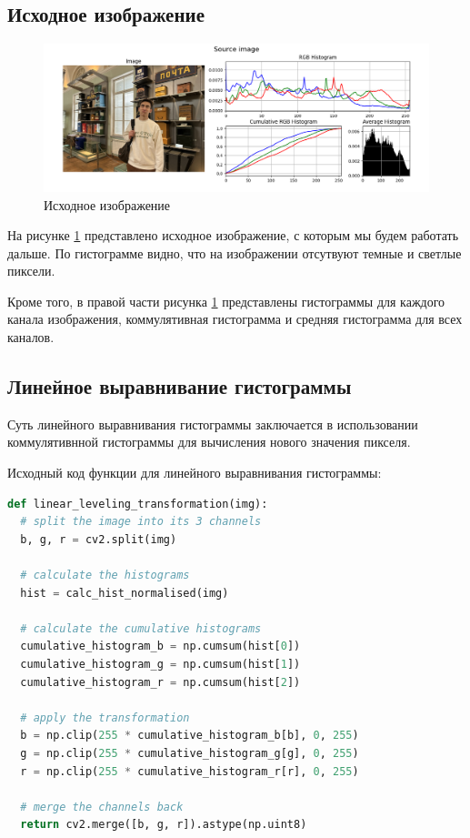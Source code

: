 \subsection{Исходное изображение}

\begin{figure}[H]
    \centering
    \includegraphics[width=\textwidth]{../results/Source image.png}
    \caption{Исходное изображение}
    \label{fig:source}
\end{figure}

На рисунке \ref{fig:source} представлено исходное изображение, с которым мы будем работать дальше. По гистограмме видно, что на изображении отсутвуют темные и светлые пиксели. 

Кроме того, в правой части рисунка \ref{fig:source} представлены гистограммы для каждого канала изображения, коммулятивная гистограмма и средняя гистограмма для всех каналов.

\subsection{Линейное выравнивание гистограммы}

Суть линейного выравнивания гистограммы заключается в использовании коммулятивнной гистограммы для вычисления нового значения пикселя.

Исходный код функции для линейного выравнивания гистограммы:

\begin{lstlisting}[language=Python]
def linear_leveling_transformation(img):
  # split the image into its 3 channels
  b, g, r = cv2.split(img)

  # calculate the histograms
  hist = calc_hist_normalised(img)

  # calculate the cumulative histograms
  cumulative_histogram_b = np.cumsum(hist[0]) 
  cumulative_histogram_g = np.cumsum(hist[1])
  cumulative_histogram_r = np.cumsum(hist[2])

  # apply the transformation
  b = np.clip(255 * cumulative_histogram_b[b], 0, 255)
  g = np.clip(255 * cumulative_histogram_g[g], 0, 255)
  r = np.clip(255 * cumulative_histogram_r[r], 0, 255)

  # merge the channels back
  return cv2.merge([b, g, r]).astype(np.uint8)
\end{lstlisting}

